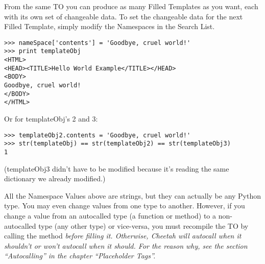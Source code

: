 From the same TO you can produce as many Filled Templates as you
want, each with its own set of changeable data.  To set the changeable data for
the next Filled Template, simply modify the Namespaces in the Search List.

\begin{verbatim}
>>> nameSpace['contents'] = 'Goodbye, cruel world!'
>>> print templateObj
<HTML>
<HEAD><TITLE>Hello World Example</TITLE></HEAD>
<BODY>
Goodbye, cruel world!
</BODY>
</HTML>
\end{verbatim}

Or for templateObj's 2 and 3:

\begin{verbatim}
>>> templateObj2.contents = 'Goodbye, cruel world!'
>>> str(templateObj) == str(templateObj2) == str(templateObj3)
1
\end{verbatim}

(templateObj3 didn't have to be modified because it's reading the same
 dictionary we already modified.)

All the Namespace Values above are strings, but they can actually be any Python
type.  You may even change values from one type to another.  However, if you
change a value from an autocalled type (a function or method) to a
non-autocalled type (any other type) or vice-versa, you must recompile the
TO by calling the  method \em{before filling it}.
Otherwise, Cheetah will autocall when it shouldn't or
won't autocall when it should.  For the reason why, see the section
``Autocalling'' in the chapter ``Placeholder Tags''.



